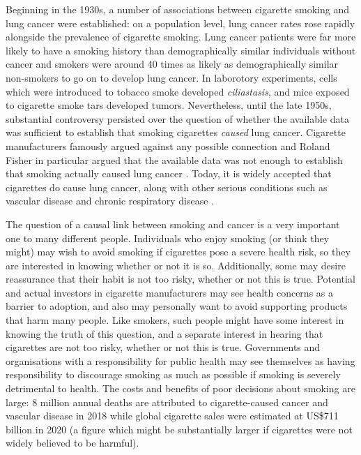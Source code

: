 Beginning in the 1930s, a number of associations between cigarette smoking and lung cancer were established: on a population level, lung cancer rates rose rapidly alongside the prevalence of cigarette smoking. Lung cancer patients were far more likely to have a smoking history than demographically similar individuals without cancer and smokers were around 40 times as likely as demographically similar non-smokers to go on to develop lung cancer. In laborotory experiments, cells which were introduced to tobacco smoke developed \emph{ciliastasis}, and mice exposed to cigarette smoke tars developed tumors\citep{proctor_history_2012}. Nevertheless, until the late 1950s, substantial controversy persisted over the question of whether the available data was sufficient to establish that smoking cigarettes \emph{caused} lung cancer. Cigarette manufacturers famously argued against any possible connection \citep{oreskes_merchants_2011} and Roland Fisher in particular argued that the available data was not enough to establish that smoking actually caused lung cancer \citep{fisher_cancer_1958}. Today, it is widely accepted that cigarettes do cause lung cancer, along with other serious conditions such as vascular disease and chronic respiratory disease \citep{world_health_organisation_tobacco_nodate,wiblin_why_2016}.

The question of a causal link between smoking and cancer is a very important one to many different people. Individuals who enjoy smoking (or think they might) may wish to avoid smoking if cigarettes pose a severe health risk, so they are interested in knowing whether or not it is so. Additionally, some may desire reassurance that their habit is not too risky, whether or not this is true. Potential and actual investors in cigarette manufacturers may see health concerns as a barrier to adoption, and also may personally want to avoid supporting products that harm many people. Like smokers, such people might have some interest in knowing the truth of this question, and a separate interest in hearing that cigarettes are not too risky, whether or not this is true. Governments and organisations with a responsibility for public health may see themselves as having responsibility to discourage smoking as much as possible if smoking is severely detrimental to health. The costs and benefits of poor decisions about smoking are large: 8 million annual deaths are attributed to cigarette-caused cancer and vascular disease in 2018\citep{world_health_organisation_tobacco_nodate} while  global cigarette sales were estimated at US\$711 billion in 2020 \citep{noauthor_cigarettes_nodate} (a figure which might be substantially larger if cigarettes were not widely believed to be harmful).

